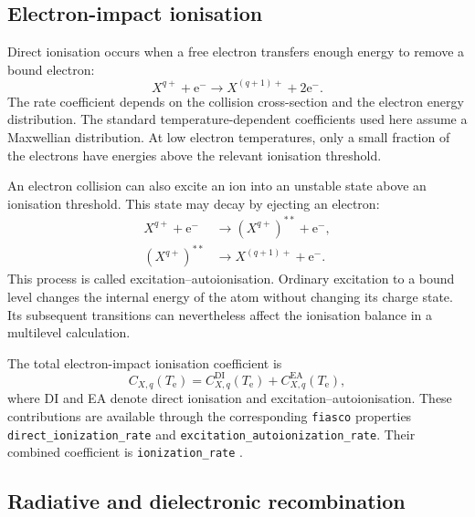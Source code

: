 \subsection{Electron-impact ionisation}
\label{subsec:electron_ionisation}

Direct ionisation occurs when a free electron transfers enough energy to
remove a bound electron:
\begin{equation}
 X^{q+}+\mathrm e^-
 \longrightarrow X^{(q+1)+}+2\mathrm e^-.
 \label{eq:ion_direct_reaction}
\end{equation}
The rate coefficient depends on the collision cross-section and the electron
energy distribution. The standard temperature-dependent coefficients used here
assume a Maxwellian distribution. At low electron temperatures, only a small
fraction of the electrons have energies above the relevant ionisation threshold.

An electron collision can also excite an ion into an unstable state above an
ionisation threshold. This state may decay by ejecting an electron:
\begin{align}
 X^{q+}+\mathrm e^-
 &\longrightarrow (X^{q+})^{**}+\mathrm e^-,
 \nonumber\\
 (X^{q+})^{**}
 &\longrightarrow X^{(q+1)+}+\mathrm e^-.
 \label{eq:ion_ea_reaction}
\end{align}
This process is called excitation--autoionisation. Ordinary excitation to a
bound level changes the internal energy of the atom without changing its
charge state. Its subsequent transitions can nevertheless affect the
ionisation balance in a multilevel calculation.

The total electron-impact ionisation coefficient is
\begin{equation}
 C_{X,q}(T_{\mathrm e})
 =C_{X,q}^{\mathrm{DI}}(T_{\mathrm e})
 +C_{X,q}^{\mathrm{EA}}(T_{\mathrm e}),
 \label{eq:ion_total_electron}
\end{equation}
where DI and EA denote direct ionisation and excitation--autoionisation.
These contributions are available through the corresponding
\texttt{fiasco} properties \texttt{direct\_ionization\_rate} and
\texttt{excitation\_autoionization\_rate}. Their combined coefficient is
\texttt{ionization\_rate} \cite{fiasco_rates}.

\subsection{Radiative and dielectronic recombination}
\label{subsec:electron_recombination}


